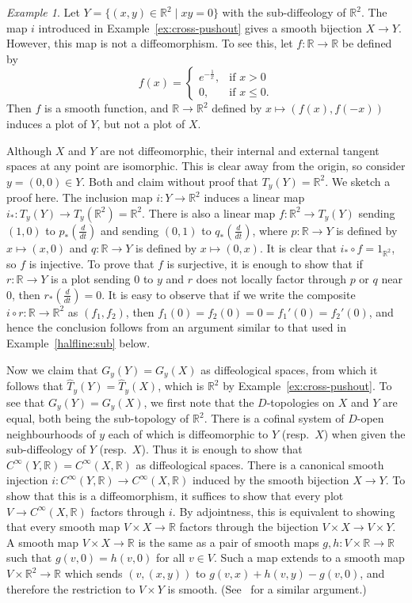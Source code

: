 \documentclass{amsart}
\theoremstyle{remark}
\newtheorem{ex}[de]{Example}
\newcommand{\ra}{\to}
\def \R{\mathbb{R}}
\begin{document}
\begin{ex}\label{ex:cross-sub}
Let $Y=\{(x,y) \in \R^2 \mid xy=0\}$ with the sub-diffeology of $\R^2$.
The map $i$ introduced in Example~\ref{ex:cross-pushout} gives a smooth bijection $X \ra Y$.
However, this map is not a diffeomorphism.
To see this, let $f:\R \ra \R$ be defined by
\[
f(x)=\begin{cases} e^{-\frac{1}{x}}, & \textrm{if $x>0$} \\
                   0,                & \textrm{if $x \leq 0$.}
     \end{cases}
\]
Then $f$ is a smooth function, and $\R \ra \R^2$ defined by $x \mapsto (f(x),f(-x))$ induces a plot of $Y$, but not a plot of $X$.

Although $X$ and $Y$ are not diffeomorphic, their internal and
external tangent spaces at any point are isomorphic.
This is clear away from the origin, so consider
$y=(0,0) \in Y$.
Both \cite[Example~4.4(i)]{He} and \cite[Example~6.2]{HM} claim without proof that
$T_y(Y)=\R^2$.
We sketch a proof here.
The inclusion map $i:Y \ra \R^2$ induces a linear map $i_*:T_y(Y) \ra T_y(\R^2)=\R^2$.
There is also a linear map $f:\R^2 \ra T_y(Y)$ sending $(1,0)$ to $p_*(\frac{d}{dt})$
and sending $(0,1)$ to $q_*(\frac{d}{dt})$,
where $p:\R \ra Y$ is defined by $x \mapsto (x,0)$ and
$q:\R \ra Y$ is defined by $x \mapsto (0,x)$.
It is clear that $i_* \circ f=1_{\R^2}$, so $f$ is injective.
To prove that $f$ is surjective, it is enough to show that
if $r:\R \ra Y$ is a plot sending $0$ to $y$ and
$r$ does not locally factor through $p$ or $q$ near $0$, then $r_*(\frac{d}{dt})=0$.
It is easy to observe that if we write the composite $i \circ r:\R \ra \R^2$
as $(f_1,f_2)$, then $f_1(0)=f_2(0)=0=f_1'(0)=f_2'(0)$,
and hence the conclusion follows from an argument similar to that used in Example~\ref{halfline:sub} below.
%
%

Now we claim that $G_y(Y)=G_y(X)$ as diffeological spaces, from which it follows that
$\hat{T}_y(Y) = \hat{T}_y(X)$, which is $\R^2$ by Example~\ref{ex:cross-pushout}.
To see that $G_y(Y)=G_y(X)$, we first note that the $D$-topologies on $X$ and $Y$ are equal,
both being the sub-topology of $\R^2$.
There is a cofinal system of $D$-open neighbourhoods of $y$ each of which is
diffeomorphic to $Y$ (resp.\ $X$) when given the sub-diffeology of $Y$ (resp.\ $X$).
Thus it is enough to show that $C^\infty(Y,\R)=C^\infty(X,\R)$ as diffeological spaces.
There is a canonical smooth injection $i: C^\infty(Y,\R) \ra C^\infty(X,\R)$ induced by the smooth bijection $X \ra Y$.
To show that this is a diffeomorphism, it suffices to show that every plot $V \ra C^\infty(X,\R)$
factors through $i$.
By adjointness, this is equivalent to showing that every smooth map $V \times X \to \R$
factors through the bijection $V \times X \to V \times Y$.
A smooth map $V \times X \to \R$ is the same
as a pair of smooth maps $g, h : V \times \R \to \R$ such that $g(v,0) = h(v,0)$ for all $v \in V$.
Such a map extends to a smooth map $V \times \R^2 \to \R$ which sends
$(v, (x,y))$ to $g(v,x) + h(v,y) - g(v,0)$, and therefore the restriction to $V \times Y$
is smooth.
(See~\cite[Example 12(c)]{V} for a similar argument.)


\end{ex}
\end{document}
